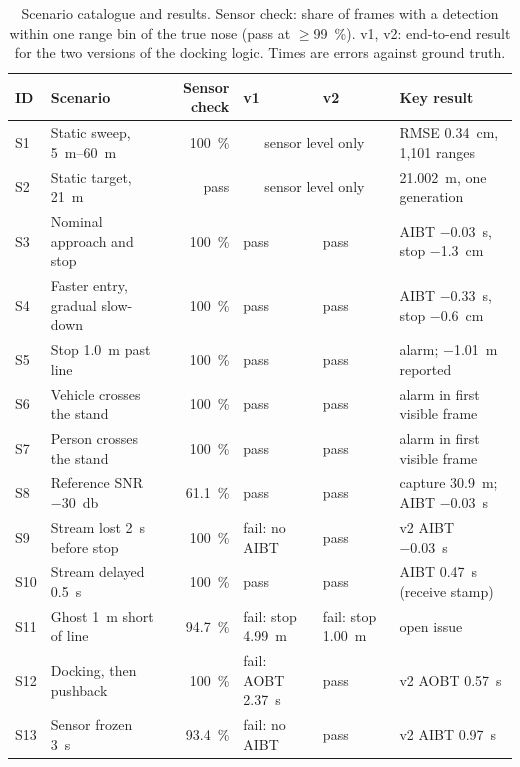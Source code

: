 \documentclass[conference]{IEEEtran}
\begin{document}
\begin{table}[t]
  \centering
  \caption{Scenario catalogue and results. Sensor check: share of frames with a detection within one range bin of the true nose (pass at $\geq$\SI{99}{\percent}). v1, v2: end-to-end result for the two versions of the docking logic. Times are errors against ground truth.}
  \label{tab:catalogue}
  \footnotesize
  \setlength{\tabcolsep}{4pt}
  \begin{tabular}{@{}llrlll@{}}
    \toprule
    ID & Scenario & Sensor check & v1 & v2 & Key result \\
    \midrule
    S1  & Static sweep, \SIrange{5}{60}{\metre} & \SI{100}{\percent} & \multicolumn{2}{c}{sensor level only} & RMSE \SI{0.34}{\centi\metre}, 1{,}101 ranges \\
    S2  & Static target, \SI{21}{\metre}            & pass & \multicolumn{2}{c}{sensor level only} & \SI{21.002}{\metre}, one generation \\
    S3  & Nominal approach and stop          & \SI{100}{\percent}  & pass & pass & AIBT \SI{-0.03}{\second}, stop \SI{-1.3}{\centi\metre} \\
    S4  & Faster entry, gradual slow-down    & \SI{100}{\percent}  & pass & pass & AIBT \SI{-0.33}{\second}, stop \SI{-0.6}{\centi\metre} \\
    S5  & Stop \SI{1.0}{\metre} past line & \SI{100}{\percent} & pass & pass & alarm; \SI{-1.01}{\metre} reported \\
    S6  & Vehicle crosses the stand          & \SI{100}{\percent}  & pass & pass & alarm in first visible frame \\
    S7  & Person crosses the stand           & \SI{100}{\percent}  & pass & pass & alarm in first visible frame \\
    S8  & Reference SNR \SI{-30}{\decibel} & \SI{61.1}{\percent} & pass & pass & capture \SI{30.9}{\metre}; AIBT \SI{-0.03}{\second} \\
    S9  & Stream lost \SI{2}{\second} before stop & \SI{100}{\percent} & fail: no AIBT & pass & v2 AIBT \SI{-0.03}{\second} \\
    S10 & Stream delayed \SI{0.5}{\second}  & \SI{100}{\percent} & pass & pass & AIBT \SI{+0.47}{\second} (receive stamp) \\
    S11 & Ghost \SI{1}{\metre} short of line & \SI{94.7}{\percent} & fail: stop \SI{+4.99}{\metre} & fail: stop \SI{+1.00}{\metre} & open issue \\
    S12 & Docking, then pushback             & \SI{100}{\percent}  & fail: AOBT \SI{+2.37}{\second} & pass & v2 AOBT \SI{+0.57}{\second} \\
    S13 & Sensor frozen \SI{3}{\second} & \SI{93.4}{\percent} & fail: no AIBT & pass & v2 AIBT \SI{+0.97}{\second} \\
    \bottomrule
  \end{tabular}
\end{table}
\end{document}
